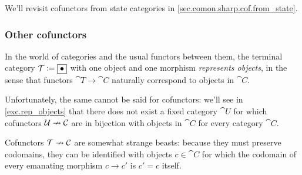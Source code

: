 \documentclass[Book-Poly]{subfiles}
\begin{document}
We'll revisit cofunctors from state categories in \cref{sec.comon.sharp.cof.from_state}.

\subsubsection{Other cofunctors}

\begin{example}\label{ex.rep_objects}
In the world of categories and the usual functors between them, the terminal category $\mathcal{T}\coloneqq\fbox{$\bullet$}$ with one object and one morphism \emph{represents objects}, in the sense that functors $\cat{T}\to\cat{C}$ naturally correspond to objects in $\cat{C}$.

Unfortunately, the same cannot be said for cofunctors: we'll see in \cref{exc.rep_objects} that there does not exist a fixed category $\cat{U}$ for which cofunctors $\mathcal{U}\nrightarrow\mathcal{C}$ are in bijection with objects in $\cat{C}$ for every category $\cat{C}$.

Cofunctors $\mathcal{T}\nrightarrow\mathcal{C}$ are somewhat strange beasts: because they must preserve codomains, they can be identified with objects $c\in\cat{C}$ for which the codomain of every emanating morphism $c\to c'$ is $c'=c$ itself.
\end{example}
\end{document}
